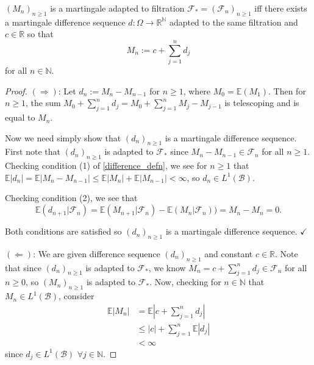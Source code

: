 \begin{lemma}
    \label{difference_martingale_equiv}
    \((M_{n})_{n \geq 1}\) is a martingale adapted to filtration \(\mathcal{F}_{*} = (\mathcal{F}_{n})_{n \geq 1}\) iff there exists a martingale difference sequence $d: \Omega \to \mathbb{R}^{\mathbb{N}}$  adapted to the same filtration and \(c \in \mathbb{R}\) so that
    \[M_{n} := c + \sum\limits_{j=1}^{n} d_{j}\]
    for all \(n \in \mathbb{N}\).
\end{lemma}

\begin{proof}
    \((\Rightarrow)\): Let \(d_{n} := M_{n} - M_{n-1}\) for \(n \geq 1\), where \(M_{0} = \mathbb{E}(M_{1})\). Then for \(n \geq 1\), the sum \(M_{0} + \sum\limits_{j=1}^{n} d_{j} = M_{0} + \sum\limits_{j=1}^{n} M_{j} - M_{j-1}\) is telescoping and is equal to \(M_{n}\).
    
    Now we need simply show that \((d_{n})_{n \geq 1}\) is a martingale difference sequence. First note that \((d_{n})_{n \geq 1}\) is adapted to \(\mathcal{F}_{*}\) since \(M_{n} - M_{n-1} \in \mathcal{F}_{n}\) for all \(n \geq 1\). Checking condition (1) of \ref{difference_defn}, we see for \(n \geq 1\) that \(\mathbb{E}|d_{n}| = \mathbb{E}|M_{n} - M_{n-1}| \leq \mathbb{E}|M_{n}| + \mathbb{E}|M_{n-1}|< \infty\), so \(d_{n} \in L^{1}(\mathcal{B})\).

    Checking condition (2), we see that
    \[\mathbb{E}(d_{n+1}|\mathcal{F}_{n}) = \mathbb{E}(M_{n+1}|\mathcal{F}_{n})- \mathbb{E}(M_{n}|\mathcal{F}_{n})) = M_{n} - M_{n} = 0. \]

    Both conditions are satisfied so \((d_{n})_{n \geq 1}\) is a martingale difference sequence. \(\checkmark\)

    \((\Leftarrow)\): We are given difference sequence \((d_{n})_{n \geq 1}\) and constant \(c \in  \mathbb{R}\). Note that since \((d_{n})_{n \geq 1}\) is adapted to \(\mathcal{F}_{*}\), we know \(M_{n} = c + \sum\limits_{j=1}^{n} d_{j} \in \mathcal{F}_{n}\) for all \(n \geq 0\), so \((M_{n})_{n \geq 1}\) is adapted to \(\mathcal{F}_{*}\). Now, checking for \(n \in \mathbb{N}\) that \(M_{n} \in L^{1}(\mathcal{B})\), consider
    \begin{align*}
        \mathbb{E}|M_{n}| &= \mathbb{E}\left| c + \sum\limits_{j=1}^{n} d_{j}  \right| \\
        & \leq  |c| + \sum\limits_{j=1}^{n} \mathbb{E}| d_{j} | \\
        & < \infty
    \end{align*}
    since \(d_{j} \in L^{1}(\mathcal{B})\) \(\forall j \in \mathbb{N}\).


\end{proof}
